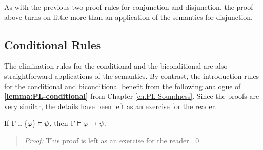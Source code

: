 As with the previous two proof rules for conjunction and disjunction, the proof above turns on little more than an application of the semantics for disjunction.




\subsection{Conditional Rules}%
  \label{sub:ConditionalRules}
  
The elimination rules for the conditional and the biconditional are also straightforward applications of the semantics.
By contrast, the introduction rules for the conditional and biconditional benefit from the following analogue of \textbf{\ref{lemma:PL-conditional}} from Chapter \ref{ch.PL-Soundness}. %
Since the proofs are very similar, the details have been left as an exercise for the reader.

\begin{Lthm} \label{lemma:cond}
  If $\Gamma \cup \lbrace\varphi\rbrace \vDash \psi$, then $\Gamma \vDash \varphi \rightarrow \psi$.
\end{Lthm}

\begin{quote} 
  \textit{Proof:}
  This proof is left as an exercise for the reader.
  \qed
\end{quote}



